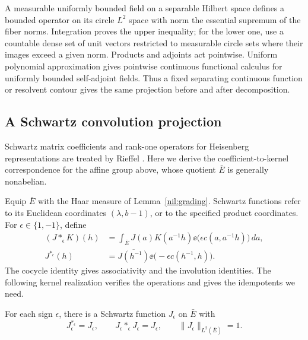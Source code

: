 A measurable uniformly bounded field on a separable Hilbert
space defines a bounded operator on its circle \(L^2\) space
with norm the essential supremum of the fiber norms.
Integration proves the upper inequality; for the lower one,
use a countable dense set of unit vectors restricted to
measurable circle sets where their images exceed a given norm.
Products and adjoints act pointwise. Uniform polynomial
approximation gives pointwise continuous functional calculus
for uniformly bounded self-adjoint fields. Thus a fixed
separating continuous function or resolvent contour gives the
same projection before and after decomposition.

\subsection{A Schwartz convolution projection}

Schwartz matrix coefficients and rank-one operators for Heisenberg
representations are treated by Rieffel
\cite[Lemma~2.3, Corollary~2.4, and Theorem~2.18]{Rieffel1988}.
Here we derive the coefficient-to-kernel correspondence for the affine
group above, whose quotient \(\bar E\) is generally nonabelian.

Equip \(\bar E\) with the Haar measure of Lemma~\ref{nil:grading}.
Schwartz functions refer to its Euclidean coordinates
\((\lambda,b-1)\), or to the specified product coordinates.
For \(\epsilon\in\{1,-1\}\), define
\begin{align*}
 (J*_\epsilon K)(h)
  &=\int_{\bar E}J(a)K(a^{-1}h)
          \ee\bigl(\epsilon c(a,a^{-1}h)\bigr)\,da,\\
 J^{*_\epsilon}(h)
  &=\overline{J(h^{-1})}
          \ee\bigl(-\epsilon c(h^{-1},h)\bigr).
\end{align*}
The cocycle identity gives associativity and the involution
identities. The following kernel realization verifies the
operations and gives the idempotents we need.

\begin{lemma}\label{nil:schwartz}
For each sign \(\epsilon\), there is a Schwartz function
\(J_\epsilon\) on \(\bar E\) with
\[
 J_\epsilon^{*_\epsilon}=J_\epsilon,\qquad
 J_\epsilon *_\epsilon J_\epsilon=J_\epsilon,\qquad
 \|J_\epsilon\|_{L^2(\bar E)}=1.
\]
\end{lemma}

